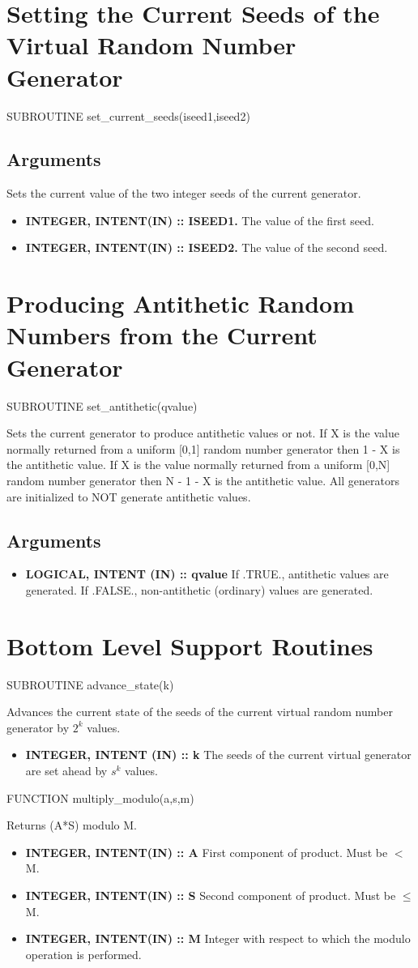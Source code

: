 \documentclass[12pt,dvips]{article}
\newcommand{\mysection}[1]{\color{blue}
            \section{#1} \normalcolor}
\newcommand{\mysubsection}[1] {\color{green}
            \subsection{#1} \normalcolor}
\newcommand{\myitem}[1]{\item{\bf \color{Violet} #1 \normalcolor}}
\begin{document}
\mysection{Setting the Current Seeds of the Virtual Random Number Generator}

      SUBROUTINE set\_current\_seeds(iseed1,iseed2)

\mysubsection{Arguments}

Sets the current value of the two integer seeds of the current generator.



\begin{itemize}

\myitem{INTEGER, INTENT(IN) :: ISEED1.}  The value of the first seed.

\myitem{INTEGER, INTENT(IN) :: ISEED2.}  The value of the second seed.

\end{itemize}

\mysection{Producing  Antithetic Random    Numbers from  the   Current
Generator}

      SUBROUTINE set\_antithetic(qvalue)

Sets the current generator to produce antithetic values  or not.  If X
is  the value normally returned  from  a uniform  [0,1] random  number
generator then  1  - X is the   antithetic value. If  X  is  the value
normally returned from a uniform [0,N] random  number generator then N
- 1 -  X is the antithetic value.   All generators  are initialized to
NOT generate antithetic values.

\mysubsection{Arguments}

\begin{itemize}

\myitem{LOGICAL,  INTENT (IN) ::  qvalue} If .TRUE., antithetic values
are generated.   If  .FALSE.,   non-antithetic  (ordinary) values  are
generated.

\end{itemize}

\mysection{Bottom Level Support Routines}

      SUBROUTINE advance\_state(k)

Advances the current state of the seeds of the current virtual random
number generator by $2^k$ values.

\begin{itemize}

\myitem{INTEGER,  INTENT (IN) ::  k} The seeds of the current virtual
generator are set ahead by $s^k$ values.

\end{itemize}

      FUNCTION multiply\_modulo(a,s,m)

Returns (A*S) modulo M.

\begin{itemize}

\myitem{INTEGER, INTENT(IN) :: A}  First component of product.  Must
be $<$ M.

\myitem{INTEGER, INTENT(IN) :: S}  Second component of product.  Must
be $\le$ M.

\myitem{INTEGER, INTENT(IN) :: M}  Integer with respect to which the
modulo operation is performed.

\end{itemize}
\end{document}
